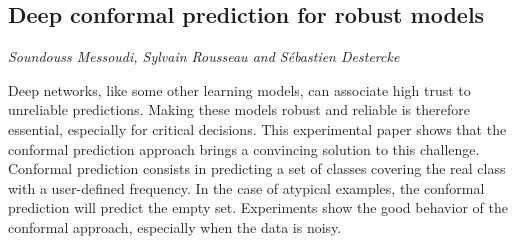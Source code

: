 \documentclass[../booklet.tex]{subfiles}
\begin{document}
\subsection[Deep conformal prediction for robust models. {\it Soundouss Messoudi, Sylvain Rousseau and Sébastien Destercke}]{Deep conformal prediction for robust models}
  

\begin{center}
  {\it Soundouss Messoudi, Sylvain Rousseau and Sébastien Destercke}
\end{center}

\vskip 0.8cm


Deep networks, like some other learning models, can associate high trust to unreliable predictions. Making these models robust and reliable is therefore essential, especially for critical decisions. This experimental paper shows that the conformal prediction approach brings a convincing solution to this challenge. Conformal prediction consists in predicting a set of classes covering the real class with a user-defined frequency. In the case of atypical examples, the conformal prediction will predict the empty set. Experiments show the good behavior of the conformal approach, especially when the data is noisy.

\end{document}
